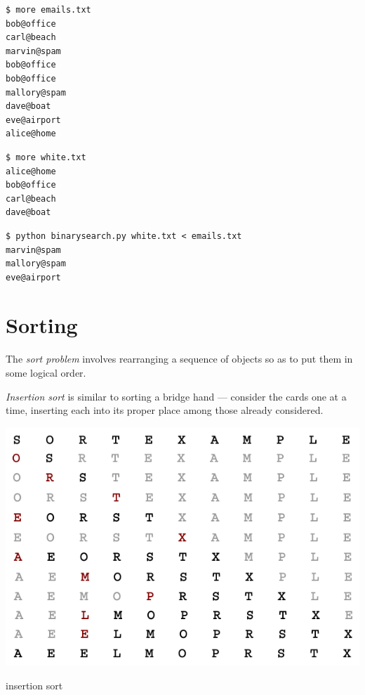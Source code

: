 \documentclass[8pt,a4paper,compress,handout]{beamer}
\begin{document}
\begin{frame}[fragile]
\begin{lstlisting}[language={}]
$ more emails.txt 
bob@office
carl@beach
marvin@spam
bob@office
bob@office
mallory@spam
dave@boat
eve@airport
alice@home
\end{lstlisting}

\begin{lstlisting}[language={}]
$ more white.txt
alice@home
bob@office
carl@beach
dave@boat
\end{lstlisting}

\begin{lstlisting}[language={}]
$ python binarysearch.py white.txt < emails.txt 
marvin@spam
mallory@spam
eve@airport
\end{lstlisting}
\end{frame}

\section{Sorting}
\begin{frame}[fragile]
The \emph{sort problem} involves rearranging a sequence of objects so as to put them in some logical order.

\bigskip

\emph{Insertion sort} is similar to sorting a bridge hand --- consider the cards one at a time, inserting each into its proper place among those already considered.
\begin{center}
\includegraphics[scale=0.3]{figures/insertion.png}

\smallskip

\tiny insertion sort
\end{center}
\end{frame}
\end{document}
